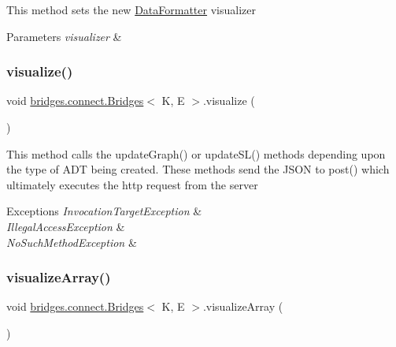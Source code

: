 This method sets the new \hyperlink{classbridges_1_1connect_1_1_data_formatter}{Data\+Formatter} visualizer 
\begin{DoxyParams}{Parameters}
{\em visualizer} & \\
\hline
\end{DoxyParams}
\hypertarget{classbridges_1_1connect_1_1_bridges_a6881ed6e3f3a1db1d3cda249eb8543a1}{}\label{classbridges_1_1connect_1_1_bridges_a6881ed6e3f3a1db1d3cda249eb8543a1} 
\subsubsection{\texorpdfstring{visualize()}{visualize()}}
{\footnotesize\ttfamily void \hyperlink{classbridges_1_1connect_1_1_bridges}{bridges.\+connect.\+Bridges}$<$ K, E $>$.visualize (\begin{DoxyParamCaption}{ }\end{DoxyParamCaption})}

This method calls the update\+Graph() or update\+S\+L() methods depending upon the type of A\+DT being created. These methods send the J\+S\+ON to post() which ultimately executes the http request from the server 
\begin{DoxyExceptions}{Exceptions}
{\em Invocation\+Target\+Exception} & \\
\hline
{\em Illegal\+Access\+Exception} & \\
\hline
{\em No\+Such\+Method\+Exception} & \\
\hline
\end{DoxyExceptions}
\hypertarget{classbridges_1_1connect_1_1_bridges_ac4e90699b288fcfbaf19e59bc4dbafb3}{}\label{classbridges_1_1connect_1_1_bridges_ac4e90699b288fcfbaf19e59bc4dbafb3} 
\subsubsection{\texorpdfstring{visualize\+Array()}{visualizeArray()}}
{\footnotesize\ttfamily void \hyperlink{classbridges_1_1connect_1_1_bridges}{bridges.\+connect.\+Bridges}$<$ K, E $>$.visualize\+Array (\begin{DoxyParamCaption}{ }\end{DoxyParamCaption})\hspace{0.3cm}{\ttfamily [protected]}}

